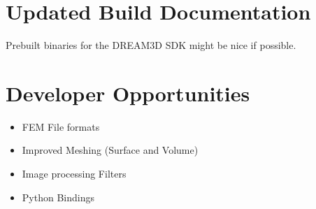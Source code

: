 \documentclass[12pt]{article} %
\begin{document}
\section{Updated Build Documentation}
  Prebuilt binaries for the DREAM3D SDK might be nice if possible.
  
\section{Developer Opportunities}
  \begin{itemize}
  \item FEM File formats
  \item Improved Meshing (Surface and Volume)
  \item Image processing Filters
  \item Python Bindings
  \end{itemize}

   
\end{document}
